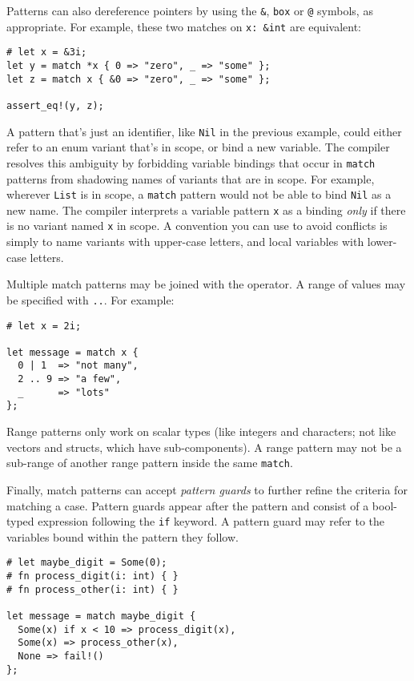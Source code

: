 \documentclass[]{article}
\begin{document}
Patterns can also dereference pointers by using the \texttt{\&},
\texttt{box} or \texttt{@} symbols, as appropriate. For example, these
two matches on \texttt{x: \&int} are equivalent:

\begin{verbatim}
# let x = &3i;
let y = match *x { 0 => "zero", _ => "some" };
let z = match x { &0 => "zero", _ => "some" };

assert_eq!(y, z);
\end{verbatim}

A pattern that's just an identifier, like \texttt{Nil} in the previous
example, could either refer to an enum variant that's in scope, or bind
a new variable. The compiler resolves this ambiguity by forbidding
variable bindings that occur in \texttt{match} patterns from shadowing
names of variants that are in scope. For example, wherever \texttt{List}
is in scope, a \texttt{match} pattern would not be able to bind
\texttt{Nil} as a new name. The compiler interprets a variable pattern
\texttt{x} as a binding \emph{only} if there is no variant named
\texttt{x} in scope. A convention you can use to avoid conflicts is
simply to name variants with upper-case letters, and local variables
with lower-case letters.

Multiple match patterns may be joined with the \texttt{\textbar{}}
operator. A range of values may be specified with \texttt{..}. For
example:

\begin{verbatim}
# let x = 2i;

let message = match x {
  0 | 1  => "not many",
  2 .. 9 => "a few",
  _      => "lots"
};
\end{verbatim}

Range patterns only work on scalar types (like integers and characters;
not like vectors and structs, which have sub-components). A range
pattern may not be a sub-range of another range pattern inside the same
\texttt{match}.

Finally, match patterns can accept \emph{pattern guards} to further
refine the criteria for matching a case. Pattern guards appear after the
pattern and consist of a bool-typed expression following the \texttt{if}
keyword. A pattern guard may refer to the variables bound within the
pattern they follow.

\begin{verbatim}
# let maybe_digit = Some(0);
# fn process_digit(i: int) { }
# fn process_other(i: int) { }

let message = match maybe_digit {
  Some(x) if x < 10 => process_digit(x),
  Some(x) => process_other(x),
  None => fail!()
};
\end{verbatim}
\end{document}
